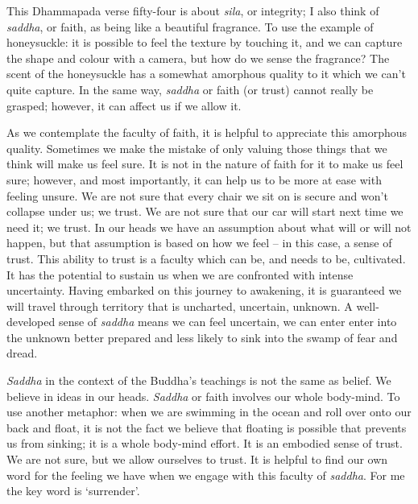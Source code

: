 This Dhammapada verse fifty-four is about \emph{sila}, or integrity; I also
think of \emph{saddha}, or faith, as being like a beautiful fragrance. To use
the example of honeysuckle: it is possible to feel the texture by
touching it, and we can capture the shape and colour with a camera, but
how do we sense the fragrance? The scent of the honeysuckle has a
somewhat amorphous quality to it which we can't quite capture. In the
same way, \emph{saddha} or faith (or trust) cannot really be grasped;
however, it can affect us if we allow it.

As we contemplate the faculty of faith, it is helpful to appreciate this
amorphous quality. Sometimes we make the mistake of only valuing those
things that we think will make us feel sure. It is not in the nature of
faith for it to make us feel sure; however, and most importantly, it can
help us to be more at ease with feeling unsure. We are not sure that
every chair we sit on is secure and won't collapse under us; we trust.
We are not sure that our car will start next time we need it; we trust.
In our heads we have an assumption about what will or will not happen,
but that assumption is based on how we feel -- in this case, a sense of
trust. This ability to trust is a faculty which can be, and needs to be,
cultivated. It has the potential to sustain us when we are confronted
with intense uncertainty. Having embarked on this journey to awakening,
it is guaranteed we will travel through territory that is uncharted,
uncertain, unknown. A well-developed sense of \emph{saddha} means we can feel
uncertain, we can enter enter into the unknown better prepared and less likely to sink into the swamp of fear and dread.

\emph{Saddha} in the context of the Buddha's teachings is not the same as
belief. We believe in ideas in our heads. \emph{Saddha} or faith involves our
whole body-mind. To use another metaphor: when we are swimming in the
ocean and roll over onto our back and float, it is not the fact we
believe that floating is possible that prevents us from sinking; it is a
whole body-mind effort. It is an embodied sense of trust. We are not
sure, but we allow ourselves to trust. It is helpful to find our own
word for the feeling we have when we engage with this faculty of
\emph{saddha}. For me the key word is `surrender'.

